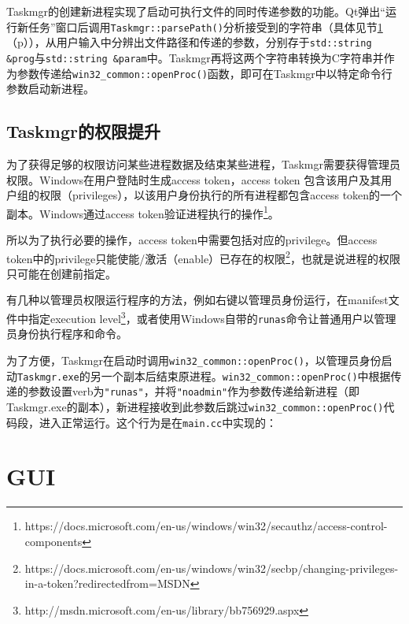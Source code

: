 \documentclass[UTF8,twoside,titlepage]{ctexart}
\newcommand\code[1]{\texttt{#1}}
\newcommand\myref[1]{\ref{#1}（p\pageref{#1}）}
\begin{document}
Taskmgr的创建新进程实现了启动可执行文件的同时传递参数的功能。Qt弹出``运行新任务''窗口后调用\code{Taskmgr::parsePath()}分析接受到的字符串（具体见节\myref{sec:gui}），从用户输入中分辨出文件路径和传递的参数，分别存于\code{std::string \&prog}与\code{std::string \&param}中。Taskmgr再将这两个字符串转换为C字符串并作为参数传递给\code{win32\_common::openProc()}函数，即可在Taskmgr中以特定命令行参数启动新进程。

\subsection{Taskmgr的权限提升}
\label{elevatepriv}
为了获得足够的权限访问某些进程数据及结束某些进程，Taskmgr需要获得管理员权限。Windows在用户登陆时生成access token，access token 包含该用户及其用户组的权限（privileges），以该用户身份执行的所有进程都包含access token的一个副本。Windows通过access token验证进程执行的操作\footnote{https://docs.microsoft.com/en-us/windows/win32/secauthz/access-control-components}。

所以为了执行必要的操作，access token中需要包括对应的privilege。但access token中的privilege只能使能/激活（enable）已存在的权限\footnote{https://docs.microsoft.com/en-us/windows/win32/secbp/changing-privileges-in-a-token?redirectedfrom=MSDN}，也就是说进程的权限只可能在创建前指定。

有几种以管理员权限运行程序的方法，例如右键以管理员身份运行，在manifest文件中指定execution level\footnote{http://msdn.microsoft.com/en-us/library/bb756929.aspx}，或者使用Windows自带的\code{runas}命令让普通用户以管理员身份执行程序和命令。

为了方便，Taskmgr在启动时调用\code{win32\_common::openProc()}，以管理员身份启动\code{Taskmgr.exe}的另一个副本后结束原进程。\code{win32\_common::openProc()}中根据传递的参数设置verb为\code{"runas"}，并将\code{"noadmin"}作为参数传递给新进程（即Taskmgr.exe的副本），新进程接收到此参数后跳过\code{win32\_\linebreak common::openProc()}代码段，进入正常运行。这个行为是在\code{main.cc}中实现的：

{
    \ttfamily
    
}

\section{GUI}
\label{sec:gui}
\end{document}
